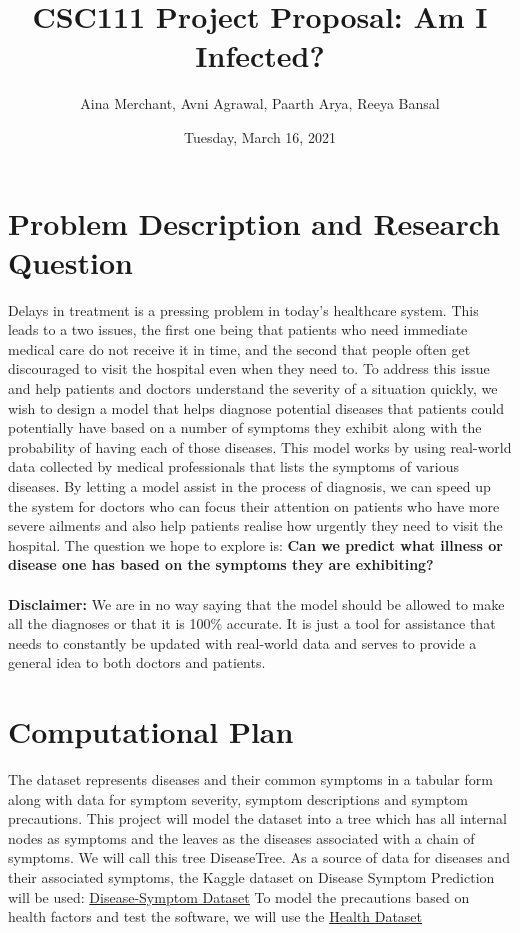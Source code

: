 \documentclass[fontsize=11pt]{article}
\title{CSC111 Project Proposal: Am I Infected?}
\author{Aina Merchant, Avni Agrawal, Paarth Arya, Reeya Bansal}
\date{Tuesday, March 16, 2021}
\begin{document}
\maketitle

\section*{Problem Description and Research Question}
Delays in treatment is a pressing problem in today's healthcare system. This leads to a two issues, the first one being that patients who need immediate medical care do not receive it in time, and the second that people often get discouraged to visit the hospital even when they need to. To address this issue and help patients and doctors understand the severity of a situation quickly, we wish to design a model that helps diagnose potential diseases that patients could potentially have based on a number of symptoms they exhibit along with the probability of having each of those diseases. This model works by using real-world data collected by medical professionals that lists the symptoms of various diseases. By letting a model assist in the process of diagnosis, we can speed up the system for doctors who can focus their attention on patients who have more severe ailments and also help patients realise how urgently they need to visit the hospital.
The question we hope to explore is:
\textbf {Can we predict what illness or disease one has based on the symptoms they are exhibiting?} \\
\\
\textbf {Disclaimer:} We are in no way saying that the model should be allowed to make all the diagnoses or that it is 100\% accurate. It is just a tool for assistance that needs to constantly be updated with real-world data and serves to provide a general idea to both doctors and patients.

\section*{Computational Plan}

The dataset represents diseases and their common symptoms in a tabular form along with data for symptom severity, symptom descriptions and symptom precautions. This project will model the dataset into a tree which has all internal nodes as symptoms and the leaves as the diseases associated with a chain of symptoms. We will call this tree DiseaseTree.
As a source of data for diseases and their associated symptoms, the Kaggle dataset on Disease Symptom Prediction will be used: \href{https://www.kaggle.com/datasets/itachi9604/disease-symptom-description-dataset}{Disease-Symptom Dataset}
To model the precautions based on health factors and test the software, we will use the 
\href{https://figshare.com/articles/dataset/Data_-_development_of_hormonal_levels_over_time_from_Is_paternal_oxytocin_an_oxymoron_oxytocin_vasopressin_testosterone_oestradiol_and_cortisol_in_emerging_fatherhood/20025810}{Health Dataset} \\
\end{document}
